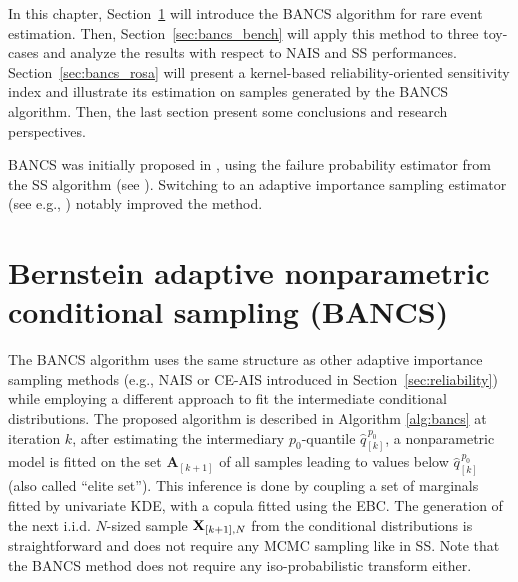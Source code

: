 In this chapter, Section~\ref{sec:bancs} will introduce the BANCS algorithm for rare event estimation. 
Then, Section~\ref{sec:bancs_bench} will apply this method to three toy-cases and analyze the results with respect to NAIS and SS performances. 
Section~\ref{sec:bancs_rosa} will present a kernel-based reliability-oriented sensitivity index and illustrate its estimation on samples generated by the BANCS algorithm. 
Then, the last section present some conclusions and research perspectives.

\begin{remark}
    BANCS was initially proposed in \citet{fekhari_ICASP_2023}, using the failure probability estimator from the SS algorithm (see ). 
    Switching to an adaptive importance sampling estimator (see e.g., ) notably improved the method.    
\end{remark}



\section{Bernstein adaptive nonparametric conditional sampling (BANCS)}\label{sec:bancs}

The BANCS algorithm uses the same structure as other adaptive importance sampling methods (e.g., NAIS or CE-AIS introduced in Section~\ref{sec:reliability}) while employing a different approach to fit the intermediate conditional distributions. 
The proposed algorithm is described in Algorithm \ref{alg:bancs} at iteration $k$, after estimating the intermediary $p_0$-quantile $\widehat{q}_{[k]}^{\, p_0}$, a nonparametric model is fitted on the set $\mathbf{A}_{[k+1]}$ of all samples leading to values below $\widehat{q}_{[k]}^{\, p_0}$ (also called ``elite set'').  
This inference is done by coupling a set of marginals fitted by univariate KDE, with a copula fitted using the EBC. 
The generation of the next i.i.d. $N$-sized sample ${\bf X}_{[k+1], N}$ from the conditional distributions is straightforward and does not require any MCMC sampling like in SS. 
Note that the BANCS method does not require any iso-probabilistic transform either.

